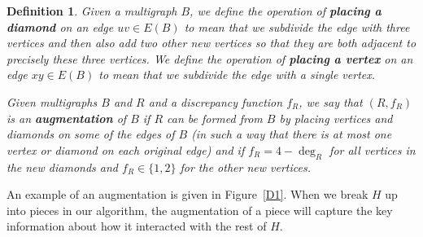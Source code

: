 \documentclass{article}
\newtheorem{Proof of Theorem}{Proof of Theorem}
\newtheorem{Definition}[Theorem]{Definition}
\begin{document}
\begin{Definition}
Given a multigraph $B$,
we define the operation of \emph{\textbf{placing a diamond}}
on an edge $uv \in E(B)$
to mean that we subdivide the edge with three vertices 
and then also add two other new vertices so that they are both adjacent to precisely these three vertices.
We define the operation of \emph{\textbf{placing a vertex}}
on an edge $xy \in E(B)$
to mean that we subdivide the edge with a single vertex.

Given multigraphs $B$ and $R$
and a discrepancy function $f_{R}$,
we say that $(R,f_{R})$ is an \emph{\textbf{augmentation}} of $B$ if $R$ can be formed from $B$ 
by placing vertices and diamonds on some of the edges of $B$
(in such a way that there is at most one vertex or diamond on each original edge)
and if $f_{R} = 4 - \deg_{R}$ for all vertices in the new diamonds
and $f_{R} \in \{1,2\}$ for the other new vertices.
\end{Definition}















An example of an augmentation is given in Figure~\ref{D1}.
When we break $H$ up into pieces in our algorithm,
the augmentation of a piece will capture the key information about how it interacted with the rest of $H$. 
\end{document}
